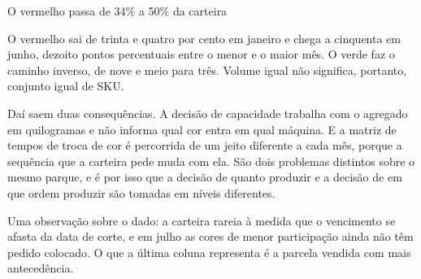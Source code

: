 \documentclass[11pt,aspectratio=169]{beamer}
\begin{document}
\begin{frame}{O vermelho passa de 34\% a 50\% da carteira}
{  O vermelho sai de trinta e quatro por cento em janeiro e chega a cinquenta em junho, dezoito
  pontos percentuais entre o menor e o maior mês. O verde faz o caminho inverso, de nove e meio
  para três. Volume igual não significa, portanto, conjunto igual de SKU.

  Daí saem duas consequências. A decisão de capacidade trabalha com o agregado em quilogramas e
  não informa qual cor entra em qual máquina. E a matriz de tempos de troca de cor é percorrida de
  um jeito diferente a cada mês, porque a sequência que a carteira pede muda com ela. São dois
  problemas distintos sobre o mesmo parque, e é por isso que a decisão de quanto produzir e a
  decisão de em que ordem produzir são tomadas em níveis diferentes.

  Uma observação sobre o dado: a carteira rareia à medida que o vencimento se afasta da data de
  corte, e em julho as cores de menor participação ainda não têm pedido colocado. O que a última
  coluna representa é a parcela vendida com mais antecedência.}
\end{frame}
\end{document}
